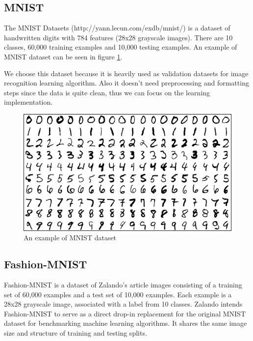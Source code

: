 \subsection{MNIST}
The MNIST Datasets (http://yann.lecun.com/exdb/mnist/) is a dataset of handwritten digits with 784 features (28x28 grayscale images). There are 10 classes, 60,000 training examples and 10,000 testing examples. An example of MNIST dataset can be seen in figure \ref{fig:mnist}.

We choose this dataset because it is heavily used as validation datasets for image recognition learning algorithm. Also it doesn't need preprocessing and formatting steps since the data is quite clean, thus we can focus on the learning implementation.

\begin{figure}[h]
	\includegraphics[scale=0.3]{figures/mnist}
	\centering
	\caption{An example of MNIST dataset}
	\label{fig:mnist}
\end{figure}

\subsection{Fashion-MNIST}
Fashion-MNIST \cite{xiao2017/online} is a dataset of Zalando's article images consisting of a training set of 60,000 examples and a test set of 10,000 examples. Each example is a 28x28 grayscale image, associated with a label from 10 classes. Zalando intends Fashion-MNIST to serve as a direct drop-in replacement for the original MNIST dataset for benchmarking machine learning algorithms. It shares the same image size and structure of training and testing splits.

